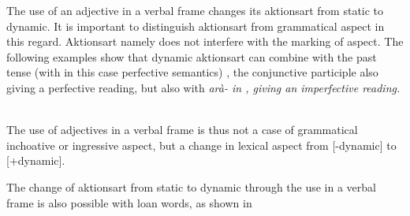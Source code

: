 
The use of an adjective in a verbal frame changes its aktionsart from static to dynamic. It is important to distinguish aktionsart from grammatical aspect in this regard. Aktionsart namely does not interfere with the marking of aspect. The following examples show that dynamic aktionsart can combine with the past tense (with in this case perfective semantics) , the conjunctive participle  also giving a perfective reading, but also with \em arà- \em in , giving an imperfective reading.






\\

The use of adjectives in a verbal frame is thus not a case of grammatical  inchoative or ingressive aspect, but a change in lexical aspect from [-dynamic] to [+dynamic].

%

The change of aktionsart from static to dynamic through the use in a verbal frame is also possible with loan words, as shown in 

